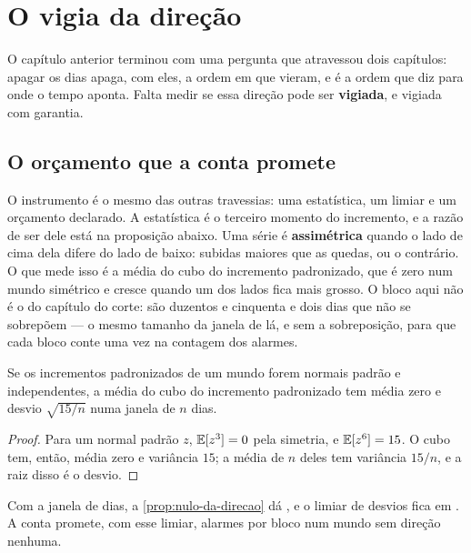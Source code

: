 \chapter{O vigia da direção}\label{cap:direcao}

O capítulo anterior terminou com uma pergunta que atravessou dois capítulos: apagar os dias apaga, com eles,
a ordem em que vieram, e é a ordem que diz para onde o tempo aponta. Falta medir se essa direção pode
ser \textbf{vigiada}, e vigiada com garantia.

\section{O orçamento que a conta promete}

O instrumento é o mesmo das outras travessias: uma estatística, um limiar e um orçamento declarado\cite{gallavotti1995dynamical,godreche2018characterising,roldan2017statistics}. A
estatística é o terceiro momento do incremento, e a razão de ser dele está na proposição abaixo.
Uma série é \textbf{assimétrica} quando o lado de cima dela difere do lado de baixo: subidas maiores
que as quedas, ou o contrário. O que mede isso é a média do cubo do incremento padronizado, que é
zero num mundo simétrico e cresce quando um dos lados fica mais grosso. O bloco aqui não é o do
capítulo do corte: são duzentos e cinquenta e dois dias que não se sobrepõem --- o mesmo tamanho da janela de lá, e sem
a sobreposição, para que cada bloco conte uma vez na contagem dos alarmes.

\begin{proposicao}\label{prop:nulo-da-direcao}
Se os incrementos padronizados de um mundo forem normais padrão e independentes, a média do cubo do
incremento padronizado tem média zero e desvio $\sqrt{15/n}$ numa janela de $n$ dias.
\end{proposicao}

\begin{proof}
Para um normal padrão $z$, $\mathbb{E}[z^3] = 0$ pela simetria, e $\mathbb{E}[z^6] = 15$. O cubo tem, então, média
zero e variância $15$; a média de $n$ deles tem variância $15/n$, e a raiz disso é o desvio.
\end{proof}

Com a janela de \numDirecaoJanela{} dias, a \cref{prop:nulo-da-direcao} dá \numDirecaoConta{}, e o limiar de
\numDirecaoZ{} desvios fica em \numDirecaoLimiar{}. A conta promete, com esse limiar,
\numDirecaoContaTaxa{} alarmes por bloco num mundo sem direção nenhuma.

